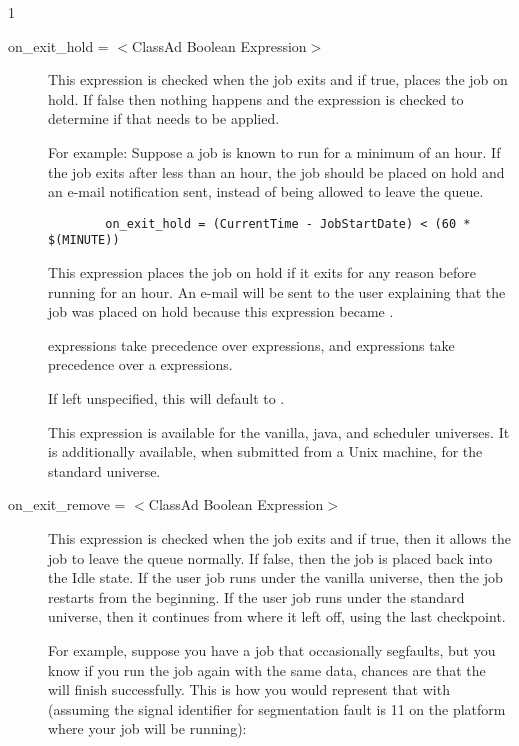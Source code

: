 \begin{ManPage}{\label{man-condor-submit}}{1}
\begin{description}

\item[on\_exit\_hold = $<$ClassAd Boolean Expression$>$] This expression
is checked when the job exits and if true, places the job on hold. If false
then nothing happens and the  expression is
checked to determine if that needs to be applied.

For example:
Suppose a job is known to run for a minimum of an hour.
If the job exits after less than an hour, the job should be placed on
hold and an e-mail notification sent,
instead of being allowed to leave the queue.

\begin{verbatim}
        on_exit_hold = (CurrentTime - JobStartDate) < (60 * $(MINUTE))
\end{verbatim}

This expression places the job on hold if it exits for any reason
before running for an hour. An e-mail will be sent to the user explaining
that the job was placed on hold because this expression became .

 expressions take
precedence over  expressions,
and  expressions take
precedence over a  expressions.

If left unspecified, this will default to .

This expression is available for the vanilla, java, and scheduler universes.
It is additionally available, when submitted from a Unix machine,
for the standard universe.


\item[on\_exit\_remove = $<$ClassAd Boolean Expression$>$] This expression
is checked when the job exits and if true, then it allows the job to leave the
queue normally. If false, then the job is placed back into the Idle state.
If the user job runs under the vanilla universe,
then the job restarts from the beginning.
If the user job runs under the standard universe,
then it continues from where it left off, using the last checkpoint.

For example,
suppose you have a job that occasionally segfaults,
but you know if you run the job again with the same data,
chances are that the will finish successfully.
This is
how you would represent that with 
(assuming the signal identifier for segmentation fault is 11 on the
platform where your job will be running):


\end{description}
\end{ManPage}

